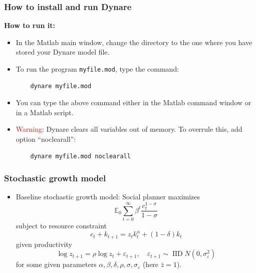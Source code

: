 \documentclass{beamer}
\begin{document}
\begin{frame}[fragile]
\frametitle{How to install and run Dynare}

\textbf{How to run it:} 
\begin{itemize}
	\item In the Matlab main window, change the directory to the one where you have stored your Dynare model file.
	\item To run the program \texttt{myfile.mod}, type the command:
	\begin{verbatim}
	dynare myfile.mod
	\end{verbatim}	
	\item You can type the above command either in the Matlab command window or in a Matlab script.
	\item \textcolor{red}{Warning}: Dynare clears all variables out of memory. To overrule this, add option ``noclearall'':
	\begin{verbatim}
	dynare myfile.mod noclearall
	\end{verbatim}
\end{itemize}
\end{frame}

\begin{frame}
\frametitle{Stochastic growth model}

\begin{itemize}
	\item Baseline stochastic growth model: Social planner maximizes
	\begin{equation*}
	\mathbb{E}_{0} \sum_{t=0}^{\infty} \beta^{t} \frac{c_{t}^{1-\sigma}}{1-\sigma}
	\end{equation*}
	subject to resource constraint
	\begin{equation*}
	c_{t}+k_{t+1}=z_{t} k_{t}^{\alpha}+(1-\delta) k_{t}
    \end{equation*}
	given productivity
	\begin{equation*}
	\log z_{t+1}=\rho \log z_{t}+\varepsilon_{t+1}, \quad \varepsilon_{t+1} \sim \operatorname{IID} N\left(0, \sigma_{\varepsilon}^{2}\right)
	\end{equation*}
	for some given parameters $ \alpha,\beta,\delta,\rho,\sigma,\sigma_{\varepsilon} $ (here $ \bar{z} = 1 $).
\end{itemize}

\end{frame}
\end{document}

